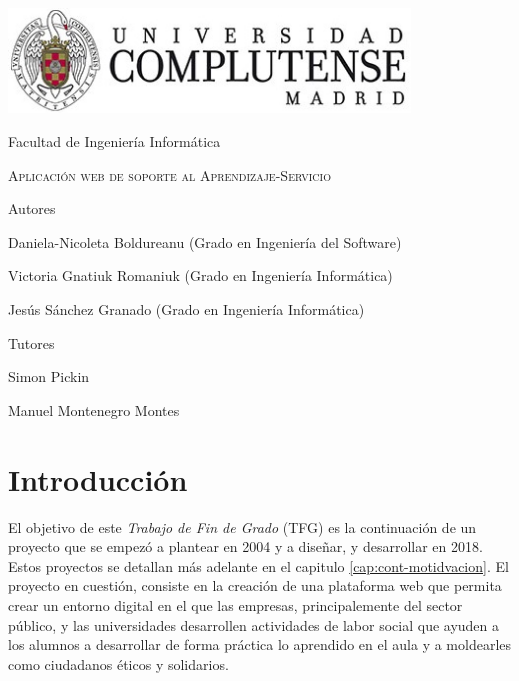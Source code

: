 \documentclass[11pt]{book}
\begin{document}
\begin{titlepage}
	\centering
	{\includegraphics[width=0.8\textwidth]{logo}\par}
	\vspace{1cm}
	{\Large Facultad de Ingeniería Informática \par}
	\vspace{3cm}
	{\scshape\Huge Aplicación web de soporte al Aprendizaje-Servicio \par}
	\vspace{5cm}
	{\textbf\Large Autores \par}
	{\Large Daniela-Nicoleta Boldureanu (Grado en Ingeniería del Software)\par}
	{\Large Victoria Gnatiuk Romaniuk (Grado en Ingeniería Informática)\par}
	{\Large Jesús Sánchez Granado (Grado en Ingeniería Informática)\par}
	\vspace{1cm}
	{\textbf\Large Tutores \par}
	{\Large Simon Pickin \par}
	{\Large Manuel Montenegro Montes \par}
	
\end{titlepage}

\tableofcontents
\newpage
\listoffigures
\chapter{Introducción}
El objetivo de este \textit{Trabajo de Fin de Grado} (TFG) es la continuación de un proyecto que se empezó a plantear en 2004 y a diseñar, y desarrollar en 2018. Estos proyectos se detallan más adelante en el capitulo \ref{cap:cont-motidvacion}. El proyecto en cuestión, consiste en la creación de una plataforma web que permita crear un entorno digital en el que las empresas, principalemente del sector público, y las universidades desarrollen actividades de labor social que ayuden a los alumnos a desarrollar de forma práctica lo aprendido en el aula y a moldearles como ciudadanos éticos y solidarios.\\ 
\end{document}
